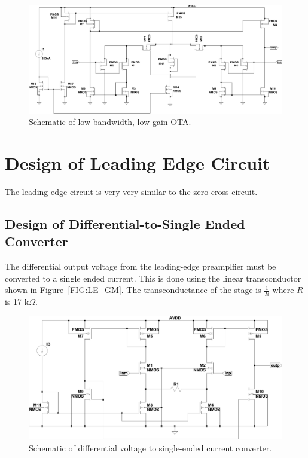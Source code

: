 \documentclass[12pt, onecolumn]{IEEEtran}
\begin{document}
\begin{figure}[htbp!]
	\centering
 	\includegraphics[scale=0.8,keepaspectratio=true, angle=90]{./images/small_gm_ota.pdf}
 	\caption{Schematic of low bandwidth, low gain OTA.}
 	\label{FIG:SMALL_GM_OTA}
\end{figure}


\section*{Design of Leading Edge Circuit}


The leading edge circuit is very very similar to the zero cross circuit.  

\subsection*{Design of Differential-to-Single Ended Converter}


The differential output voltage from the leading-edge preamplfier must be converted to a single ended current. This is done using the linear transconductor shown in Figure~\ref{FIG:LE_GM}.  The transconductance of the stage is $\frac{1}{R}$ where $R$ is 17 k$\Omega$.

\begin{figure}[htbp!]
	\centering
 	\includegraphics[scale=0.65,keepaspectratio=true]{./images/le_gm.pdf}
 	\caption{Schematic of differential voltage to single-ended current converter.}
 	\label{FIG:LE_GN}
\end{figure}
\end{document}
